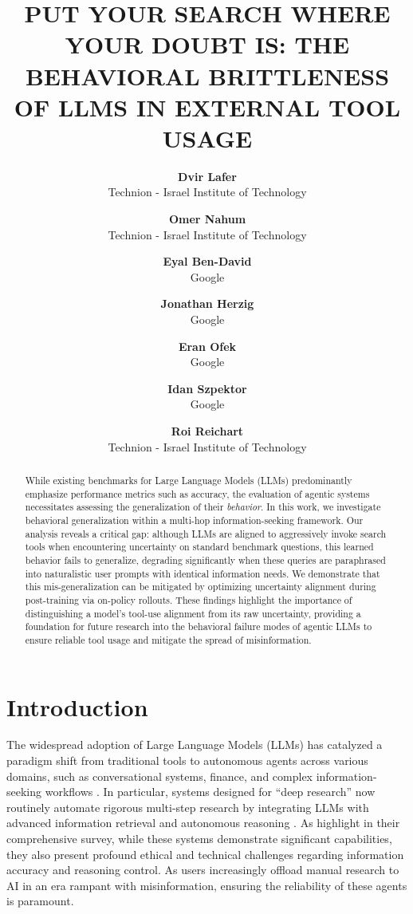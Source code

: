 \documentclass[10pt, letterpaper]{article}
\title{\vspace{-1cm}\Large \bf PUT YOUR SEARCH WHERE YOUR DOUBT IS: THE BEHAVIORAL BRITTLENESS OF LLMS IN EXTERNAL TOOL USAGE}
\author{
  \textbf{Dvir Lafer} \\
  Technion - Israel Institute of Technology \\
  \and
  \textbf{Omer Nahum} \\
  Technion - Israel Institute of Technology \\
  \and
  \textbf{Eyal Ben-David} \\
  Google \\
  \and
  \textbf{Jonathan Herzig} \\
  Google \\
  \and
  \textbf{Eran Ofek} \\
  Google \\
  \and
  \textbf{Idan Szpektor} \\
  Google \\
  \and
  \textbf{Roi Reichart} \\
  Technion - Israel Institute of Technology \\
  \and
}
\date{}
\begin{document}
\maketitle

\begin{abstract}
While existing benchmarks for Large Language Models (LLMs) predominantly emphasize performance metrics such as accuracy, the evaluation of agentic systems necessitates assessing the generalization of their \emph{behavior}. In this work, we investigate behavioral generalization within a multi-hop information-seeking framework. Our analysis reveals a critical gap: although LLMs are aligned to aggressively invoke search tools when encountering uncertainty on standard benchmark questions, this learned behavior fails to generalize, degrading significantly when these queries are paraphrased into naturalistic user prompts with identical information needs. We demonstrate that this mis-generalization can be mitigated by optimizing uncertainty alignment during post-training via on-policy rollouts. These findings highlight the importance of distinguishing a model's tool-use alignment from its raw uncertainty, providing a foundation for future research into the behavioral failure modes of agentic LLMs to ensure reliable tool usage and mitigate the spread of misinformation.
\end{abstract}

\section{Introduction}

The widespread adoption of Large Language Models (LLMs) has catalyzed a paradigm shift from traditional tools to autonomous agents across various domains, such as conversational systems, finance, and complex information-seeking workflows \cite{abbasian_conversational_2024, xiao_tradingagents_2025}. In particular, systems designed for ``deep research'' now routinely automate rigorous multi-step research by integrating LLMs with advanced information retrieval and autonomous reasoning \cite{xu_comprehensive_2025}. As \citet{xu_comprehensive_2025} highlight in their comprehensive survey, while these systems demonstrate significant capabilities, they also present profound ethical and technical challenges regarding information accuracy and reasoning control. As users increasingly offload manual research to AI in an era rampant with misinformation, ensuring the reliability of these agents is paramount.
\end{document}
